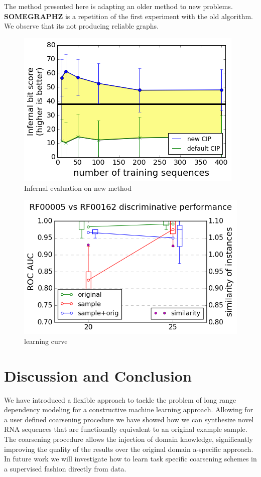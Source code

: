 \documentclass{article}
\begin{document}
The method presented here is adapting an older method to new problems.
\textbf{SOMEGRAPHZ} is a repetition of the first experiment with 
the old algorithm. We observe that its not producing reliable
graphs.
\begin{figure}[ht]
      \centering
        \includegraphics[width=0.8\linewidth]{images/infernal_abstr.png}
      \caption{Infernal evaluation on new method}
      \label{alabelb}
\end{figure}

\begin{figure}[ht]
      \centering
        \includegraphics[width=0.8\linewidth]{images/learningcurve.png}
      \caption{learning curve}
      \label{alabelc}
\end{figure}



\section{Discussion and Conclusion} 

We have introduced a flexible approach to tackle the problem of long range
dependency modeling for a constructive machine learning approach. Allowing for
a user defined coarsening procedure we have showed how we can synthesize novel
RNA sequences that are functionally equivalent to an original example sample.
The coarsening procedure allows the injection of domain knowledge,
significantly improving the quality of the results over the original domain a-specific approach. In future work we will investigate how to learn task
specific coarsening schemes in a supervised fashion directly from data.



\end{document}
